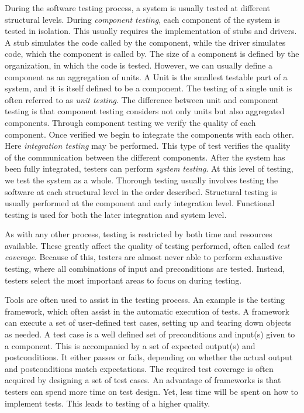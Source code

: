 During the software testing process, a system is usually tested at different structural levels. During \emph{component testing}, each component of the system is tested in isolation. This usually requires the implementation of stubs and drivers. A stub simulates the code called by the component, while the driver simulates code, which the component is called by. The size of a component is defined by the organization, in which the code is tested. However, we can usually define a component as an aggregation of units. A Unit is the smallest testable part of a system, and it is itself defined to be a component. The testing of a single unit is often referred to as \emph{unit testing}. The difference between unit and component testing is that component testing considers not only units but also aggregated components. Through component testing we verify the quality of each component. Once verified we begin to integrate the components with each other. Here \emph{integration testing} may be performed. This type of test verifies the quality of the communication between the different components. After the system has been fully integrated, testers can perform \emph{system testing}. At this level of testing, we test the system as a whole. Thorough testing usually involves testing the software at each structural level in the order described. Structural testing is usually performed at the component and early integration level. Functional testing is used for both the later integration and system level.

As with any other process, testing is restricted by both time and resources available. These greatly affect the quality of testing performed, often called \emph{test coverage}. Because of this, testers are almost never able to perform exhaustive testing, where all combinations of input and preconditions are tested. Instead, testers select the most important areas to focus on during testing.

Tools are often used to assist in the testing process. An example is the testing framework, which often assist in the automatic execution of tests. A framework can execute a set of user-defined test cases, setting up and tearing down objects as needed. A test case is a well defined set of preconditions and input(s) given to a component. This is accompanied by a set of expected output(s) and postconditions. It either passes or fails, depending on whether the actual output and postconditions match expectations. The required test coverage is often acquired by designing a set of test cases. An advantage of frameworks is that testers can spend more time on test design. Yet, less time will be spent on how to implement tests. This leads to testing of a higher quality.

